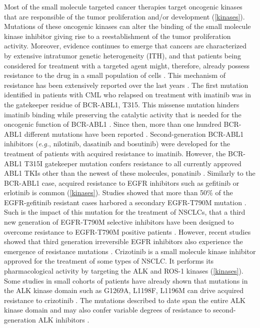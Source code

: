 \documentclass[11pt, b5paper,twoside]{tesi_upf}
\begin{document}
\par Most of the small molecule targeted cancer therapies target oncogenic kinases that are responsible of the tumor proliferation and/or development (\cref{kinases}). Mutations of these oncogenic kinases can alter the binding of the small molecule kinase inhibitor giving rise to a reestablishment of the tumor proliferation activity. Moreover, evidence continues to emerge that cancers are characterized by extensive intratumor genetic heterogeneity (ITH), and that patients being considered for treatment with a targeted agent might, therefore, already possess resistance to the drug in a small population of cells \cite{Schmitt2015}. This mechanism of resistance has been extensively reported over the last years \cite{Chen2011, Barouch-Bentov2011a}. The first mutation identified in patients with CML who relapsed on treatment with imatinib was in the gatekeeper residue of BCR-ABL1, T315. This missense  mutation hinders imatinib binding while preserving the catalytic activity that is needed for the oncogenic function of BCR-ABL1 \cite{Gorre2001}. Since then, more than one hundred BCR-ABL1 different mutations have been reported \cite{Soverini2016}. Second-generation BCR-ABL1 inhibitors (\textit{e.g.}, nilotinib, dasatinib and bosutinib) were developed for the treatment of patients with acquired resistance to imatinib. However, the BCR-ABL1 T315I gatekeeper mutation confers resistance to all currently approved ABL1 TKIs other than the newest of these molecules, ponatinib \cite{Soverini2016}. Similarly to the BCR-ABL1 case, acquired resistance to EGFR inhibitors such as gefitinib or erlotinib is common (\cref{kinases}). Studies showed that more than 50$\%$ of the EGFR-gefitinib resistant cases harbored a secondary EGFR-T790M mutation \cite{Shih2005}. Such is the impact of this mutation for the treatment of NSCLCs, that a third new generation of EGFR-T790M selective inhibitors have been designed to overcome resistance to EGFR-T790M positive patients \cite{Walter2013, Cross2014}. However, recent studies showed that third generation irreversible EGFR inhibitors also experience the emergence of resistance mutations \cite{Ercan2015}. Crizotinib is a small molecule kinase inhibitor approved for the treatment of some types of NSCLC. It performs its pharmacological activity by targeting the ALK and ROS-1 kinases (\cref{kinases}). Some studies in small cohorts of patients have already shown that mutations in the ALK kinase domain such as G1269A, L1198F, L1196M can drive acquired resistance to crizotinib \cite{Doebele2012, Shaw2015}. The mutations described to date span the entire ALK kinase domain and may also confer variable degrees of resistance to second-generation ALK inhibitors \cite{Wu2016}. 
\end{document}
